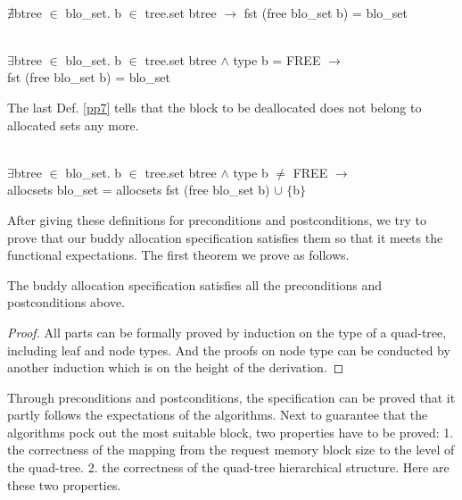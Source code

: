 \begin{definition}  \\
	$\nexists$btree $\in$ blo\_set. b $\in$ tree.set btree $\longrightarrow$ fst (free blo\_set b) = blo\_set
	\label{pp5}
\end{definition}

\begin{definition}  \\
	$\exists$btree $\in$ blo\_set. b $\in$ tree.set btree $\wedge$ type b = FREE $\longrightarrow$ \\
	\phantom{x} \hspace{10pt} fst (free blo\_set b) = blo\_set
	\label{pp6}
\end{definition}

The last Def. \ref{pp7} tells that the block to be deallocated does not belong to allocated sets any more.

\begin{definition}  \\
	$\exists$btree $\in$ blo\_set. b $\in$ tree.set btree $\wedge$ type b $\neq$ FREE $\longrightarrow$ \\
	\phantom{x} \hspace{10pt} allocsets blo\_set = allocsets fst (free blo\_set b) $\cup$ $\lbrace$b$\rbrace$
	\label{pp7}
\end{definition}

After giving these definitions for preconditions and postconditions, we try to prove that our buddy allocation specification satisfies them so that it meets the functional expectations. The first theorem we prove as follows.

\begin{theorem}
The buddy allocation specification satisfies all the preconditions and postconditions above.
\end{theorem}

\begin{proof}
	All parts can be formally proved by induction on the type of a quad-tree, including leaf and node types. And the proofs on node type can be conducted by another induction which is on the height of the derivation.
\end{proof}

Through preconditions and postconditions, the specification can be proved that it partly follows the expectations of the algorithms. Next to guarantee that the algorithms pock out the most suitable block, two properties have to be proved: 1. the correctness of the mapping from the request memory block size to the level of the quad-tree. 2. the correctness of the quad-tree hierarchical structure. Here are these two properties.

